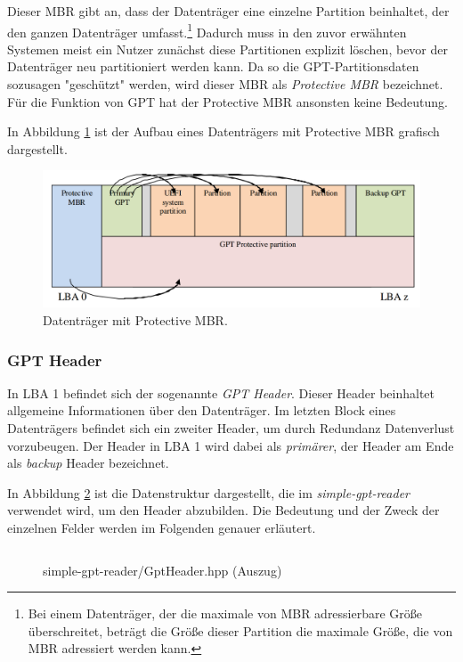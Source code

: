 Dieser MBR gibt an, dass der Datenträger eine einzelne Partition beinhaltet, der den ganzen Datenträger umfasst.\footnote{
    Bei einem Datenträger, der die maximale von MBR adressierbare Größe überschreitet, beträgt die Größe dieser Partition die maximale Größe, die von MBR adressiert werden kann.
}
Dadurch muss in den zuvor erwähnten Systemen meist ein Nutzer zunächst diese Partitionen explizit löschen, bevor der Datenträger neu partitioniert werden kann.
Da so die GPT-Partitionsdaten sozusagen "geschützt" werden, wird dieser MBR als \textit{Protective MBR} bezeichnet.
Für die Funktion von GPT hat der Protective MBR ansonsten keine Bedeutung.

In Abbildung \ref{fig:protective-mbr} ist der Aufbau eines Datenträgers mit Protective MBR grafisch dargestellt.

\begin{figure}[ht]
    \includegraphics[width=\textwidth]{content/graphics/GPT_Layout_with_protective_MBR.png}
    
    \caption{Datenträger mit Protective MBR. \cite{uefi-spec}}
    \label{fig:protective-mbr}
\end{figure}


\subsubsection{GPT Header}
In LBA 1 befindet sich der sogenannte \textit{GPT Header}.
Dieser Header beinhaltet allgemeine Informationen über den Datenträger.
Im letzten Block eines Datenträgers befindet sich ein zweiter Header, um durch Redundanz Datenverlust vorzubeugen.
Der Header in LBA 1 wird dabei als \textit{primärer}, der Header am Ende als \textit{backup} Header bezeichnet.

In Abbildung \ref{fig:GptHeader.hpp} ist die Datenstruktur dargestellt, die im \textit{simple-gpt-reader} verwendet wird, um den Header abzubilden.
Die Bedeutung und der Zweck der einzelnen Felder werden im Folgenden genauer erläutert.

\begin{figure}[ht]
    \inputminted[baselinestretch=1.2, linenos, tabsize=4, breaklines, frame=single]{c++}{content/code/simple-gpt-reader/GptHeader.hpp}
    
    \caption{simple-gpt-reader/GptHeader.hpp (Auszug)}
    \label{fig:GptHeader.hpp}
\end{figure}

